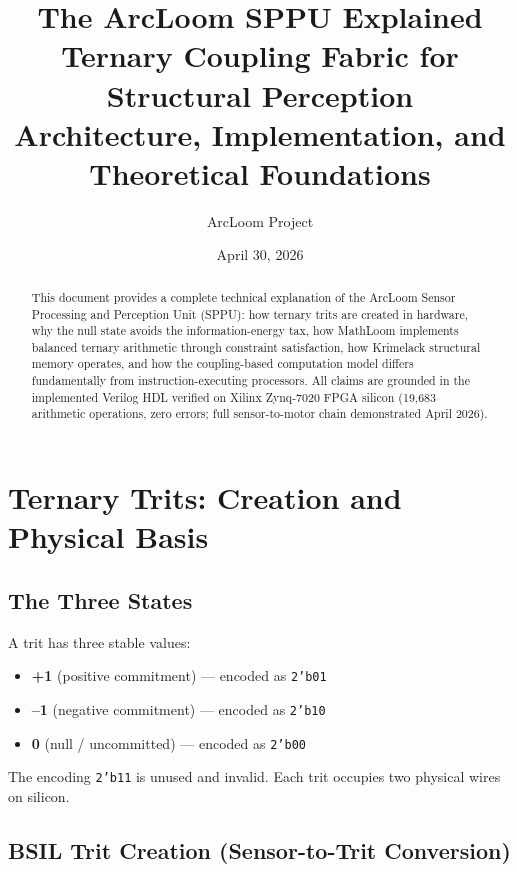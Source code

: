 \documentclass[11pt,a4paper]{article}
\title{\textbf{The ArcLoom SPPU Explained}\\[0.5em]
\large Ternary Coupling Fabric for Structural Perception\\[0.3em]
\normalsize Architecture, Implementation, and Theoretical Foundations}
\author{ArcLoom Project}
\date{April 30, 2026}
\begin{document}
\maketitle
\thispagestyle{empty}

\vspace{1em}
\begin{abstract}
This document provides a complete technical explanation of the ArcLoom Sensor Processing and Perception Unit (SPPU): how ternary trits are created in hardware, why the null state avoids the information-energy tax, how MathLoom implements balanced ternary arithmetic through constraint satisfaction, how Krimelack structural memory operates, and how the coupling-based computation model differs fundamentally from instruction-executing processors. All claims are grounded in the implemented Verilog HDL verified on Xilinx Zynq-7020 FPGA silicon (19,683 arithmetic operations, zero errors; full sensor-to-motor chain demonstrated April 2026).
\end{abstract}

\tableofcontents
\newpage

\section{Ternary Trits: Creation and Physical Basis}

\subsection{The Three States}

A trit has three stable values:
\begin{itemize}
    \item \textbf{+1} (positive commitment) --- encoded as \texttt{2'b01}
    \item \textbf{--1} (negative commitment) --- encoded as \texttt{2'b10}
    \item \textbf{0} (null / uncommitted) --- encoded as \texttt{2'b00}
\end{itemize}

The encoding \texttt{2'b11} is unused and invalid. Each trit occupies two physical wires on silicon.

\subsection{BSIL Trit Creation (Sensor-to-Trit Conversion)}
\end{document}
